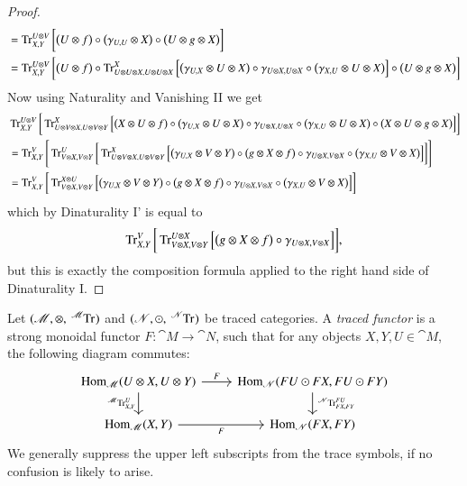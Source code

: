 \documentclass[12pt,oneside,article,draft]{memoir}
\begin{document}
\begin{enumerate}
{\begin{proof}
{\begin{align*}
  &=\operatorname{Tr}^{U\otimes V}_{X,Y}\bigg[\big(U\otimes f\big)\circ\big(\gamma_{U,U}\otimes X\big)\circ\big(U\otimes g\otimes X\big)\bigg]\\
  &=\operatorname{Tr}^{U\otimes V}_{X,Y}\bigg[\big(U\otimes f\big)\circ\operatorname{Tr}^X_{U\otimes U\otimes X,U\otimes U\otimes X}\Big[\big(\gamma_{U,X}\otimes U\otimes X\big)\circ\gamma_{U\otimes X, U\otimes X}\circ\big(\gamma_{X,U}\otimes U\otimes X\big)\Big]\circ\big(U\otimes g\otimes X\big)\bigg]
 \end{align*}
 Now using Naturality and Vanishing II we get
 \begin{align*}
  &\operatorname{Tr}^{U\otimes V}_{X,Y}\bigg[\operatorname{Tr}^X_{U\otimes V\otimes X,U\otimes V\otimes Y}\Big[\big(X\otimes U\otimes f\big)\circ\big(\gamma_{U,X}\otimes U\otimes X\big)\circ\gamma_{U\otimes X, U\otimes X}\circ\big(\gamma_{X,U}\otimes U\otimes X\big)\circ\big(X\otimes U\otimes g\otimes X\big)\Big]\bigg]\\
  &=\operatorname{Tr}^V_{X,Y}\Bigg[\operatorname{Tr}^U_{V\otimes X,V\otimes Y}\bigg[\operatorname{Tr}^X_{U\otimes V\otimes X,U\otimes V\otimes Y}\Big[\big(\gamma_{U,X}\otimes V\otimes Y\big)\circ\big(g\otimes X\otimes f\big)\circ\gamma_{U\otimes X, V\otimes X}\circ\big(\gamma_{X,U}\otimes V\otimes X\big)\Big]\bigg]\Bigg]\\
  &=\operatorname{Tr}^V_{X,Y}\bigg[\operatorname{Tr}^{X\otimes U}_{V\otimes X,V\otimes Y}\Big[\big(\gamma_{U,X}\otimes V\otimes Y\big)\circ\big(g\otimes X\otimes f\big)\circ\gamma_{U\otimes X, V\otimes X}\circ\big(\gamma_{X,U}\otimes V\otimes X\big)\Big]\bigg]
 \end{align*}
 which by Dinaturality I' is equal to
 \[\operatorname{Tr}^V_{X,Y}\bigg[\operatorname{Tr}^{U\otimes X}_{V\otimes X,V\otimes Y}\Big[\big(g\otimes X\otimes f\big)\circ\gamma_{U\otimes X, V\otimes X}\Big]\bigg],\]
 but this is exactly the composition formula applied to the right hand side of Dinaturality I.}%
\end{proof}
\begin{definition}\label{def:traced functor}
	Let $(\cat{M},\otimes,\tensor*[^{\cat{M}}]{\Tr}{})$ and $(\cat{N},\odot,\tensor*[^{\cat{N}}]{\Tr}{})$ be traced categories.
	A \emph{traced functor} is a strong monoidal functor $F\colon\cat{M}\to\cat{N}$, such that for any objects $X,Y,U\in\cat{M}$, the following diagram commutes:
	$$
	\begin{tikzcd}
		\Hom_{\cat{M}}(U\otimes X,U\otimes Y)
			\rar{F}
			\dar[swap]{\tensor*[^{\cat{M}}]{\Tr}{^U_{X,Y}}}
		& \Hom_{\cat{N}}(FU\odot FX,FU\odot FY)
			\dar{\tensor*[^{\cat{N}}]{\Tr}{^{FU}_{FX,FY}}} \\
		\Hom_{\cat{M}}(X,Y)
			\rar[swap]{F}
		& \Hom_{\cat{N}}(FX,FY)
	\end{tikzcd}
	$$
	We generally suppress the upper left subscripts from the trace symbols, if no confusion is likely to arise.
\end{definition}

}
\end{enumerate}
\end{document}
